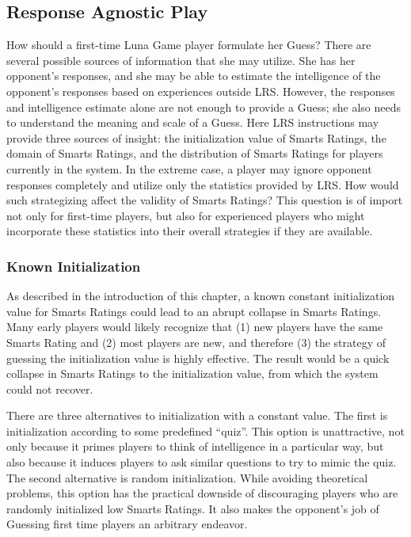 \subsection{Response Agnostic Play}

How should a first-time Luna Game player formulate her Guess? There are several possible sources of information that she may utilize. She has her opponent's responses, and she may be able to estimate the intelligence of the opponent's responses based on experiences outside LRS. However, the responses and intelligence estimate alone are not enough to provide a Guess; she also needs to understand the meaning and scale of a Guess. Here LRS instructions may provide three sources of insight: the initialization value of Smarts Ratings, the domain of Smarts Ratings, and the distribution of Smarts Ratings for players currently in the system. In the extreme case, a player may ignore opponent responses completely and utilize only the statistics provided by LRS. How would such strategizing affect the validity of Smarts Ratings? This question is of import not only for first-time players, but also for experienced players who might incorporate these statistics into their overall strategies if they are available.

\subsubsection{Known Initialization}

As described in the introduction of this chapter, a known constant initialization value for Smarts Ratings could lead to an abrupt collapse in Smarts Ratings. Many early players would likely recognize that (1) new players have the same Smarts Rating and (2) most players are new, and therefore (3) the strategy of guessing the initialization value is highly effective. The result would be a quick collapse in Smarts Ratings to the initialization value, from which the system could not recover. 

There are three alternatives to initialization with a constant value. The first is initialization according to some predefined ``quiz''. This option is unattractive, not only because it primes players to think of intelligence in a particular way, but also because it induces players to ask similar questions to try to mimic the quiz. The second alternative is random initialization. While avoiding theoretical problems, this option has the practical downside of discouraging players who are randomly initialized low Smarts Ratings. It also makes the opponent's job of Guessing first time players an arbitrary endeavor.

